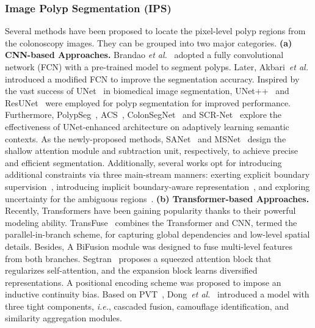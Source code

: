 \documentclass[default,iicol]{sn-jnl}
\theoremstyle{thmstyleone}
\theoremstyle{thmstyletwo}
\theoremstyle{thmstylethree}
\def\ie{\emph{i.e.}}
\def\etal{{\em et al.}}
\begin{document}
\subsubsection{Image Polyp Segmentation (IPS)}
Several methods have been proposed to locate the pixel-level polyp regions from the colonoscopy images.
They can be grouped into two major categories.
\textbf{(a) CNN-based Approaches.}
Brandao \etal~\cite{brandao2017fully} adopted a fully convolutional network (FCN) with a pre-trained model to segment polyps.
Later, Akbari~\etal~\cite{akbari2018polyp} introduced a modified FCN to improve the segmentation accuracy.
Inspired by the vast success of UNet~\cite{ronneberger2015u} in biomedical image segmentation, UNet++~\cite{zhou2018unetplus} and ResUNet~\cite{jha2019resunetplus} were employed for polyp segmentation for improved performance.
Furthermore, PolypSeg~\cite{zhong2020polypseg}, ACS~\cite{zhang2020adaptive}, ColonSegNet~\cite{jha2021real} and SCR-Net~\cite{wu2021precise} explore the effectiveness of UNet-enhanced architecture on adaptively learning semantic contexts.
As the newly-proposed methods, SANet~\cite{wei2021shallow} and MSNet~\cite{zhao2021automatic} design the shallow attention module and subtraction unit, respectively, to achieve precise and efficient segmentation.
Additionally, several works opt for introducing additional constraints via three main-stream manners: exerting explicit boundary supervision~\cite{murugesan2019psi,wang2022boundary,fang2019selective,shen2021hrenet,ji2022eernet}, introducing implicit boundary-aware representation~\cite{fan2020pra,nguyen2021ccbanet,cheng2021learnable}, and exploring uncertainty for the ambiguous regions~\cite{kim2021uacanet}.
\textbf{(b) Transformer-based Approaches.}
Recently, Transformers \cite{shamshad2022transformers} have been gaining popularity thanks to their powerful modeling ability.
TransFuse~\cite{zhang2021transfuse} combines the Transformer and CNN, termed the parallel-in-branch scheme, for capturing global dependencies and low-level spatial details.
Besides, A BiFusion module was designed to fuse multi-level features from both branches.
Segtran~\cite{li2021medical} proposes a squeezed attention block that regularizes self-attention, and the expansion block learns diversified representations.
A positional encoding scheme was proposed to impose an inductive continuity bias.
Based on PVT~\cite{wang2021pvtv2}, Dong~\etal~\cite{dong2021polyp} introduced a model with three tight components, \ie, cascaded fusion, camouflage identification, and similarity aggregation modules.
\end{document}
